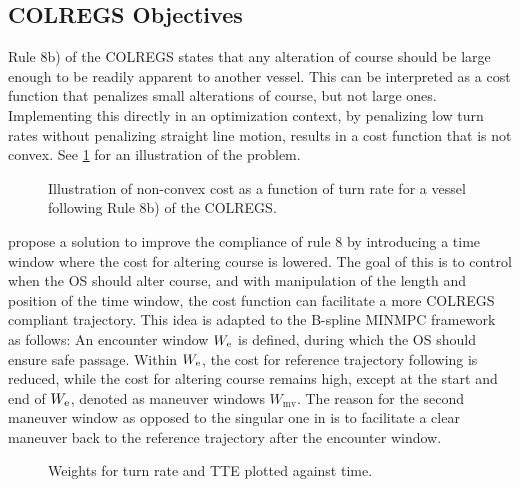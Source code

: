 \FloatBarrier
\subsection{COLREGS Objectives}\label{sec:colregs-objectives}
Rule 8b) of the COLREGS states that any alteration of course should be large enough to be readily apparent to another vessel. 
This can be interpreted as a cost function that penalizes small alterations of course, but not large ones. 
Implementing this directly in an optimization context, by penalizing low turn rates without penalizing straight line motion, results in a cost function that is not convex. 
See \cref{fig:turn-rate-cost} for an illustration of the problem.

\begin{figure}
    \centering
    
    \caption{Illustration of non-convex cost as a function of turn rate for a vessel following Rule 8b) of the COLREGS.}
    \label{fig:turn-rate-cost}
\end{figure}

\cite{Thyri2022-MPC} propose a solution to improve the compliance of rule 8 by introducing a time window where the cost for altering course is lowered. The goal of this is to control when the OS should alter course, and with manipulation of the length and position of the time window, the cost function can facilitate a more COLREGS compliant trajectory. This idea is adapted to the B-spline MINMPC framework as follows:
An encounter window $W_\text e$ is defined, during which the OS should ensure safe passage. Within $W_\text e$, the cost for reference trajectory following is reduced, while the cost for altering course remains high, except at the start and end of $W_\text e$, denoted as maneuver windows $W_\text{mv}$. 
The reason for the second maneuver window as opposed to the singular one in \cite{Thyri2022-MPC} is to facilitate a clear maneuver back to the reference trajectory after the encounter window.

\begin{figure}
    \centering
    
    \caption{Weights for turn rate and TTE plotted against time.}
    \label{fig:maneuver-window}
\end{figure}

